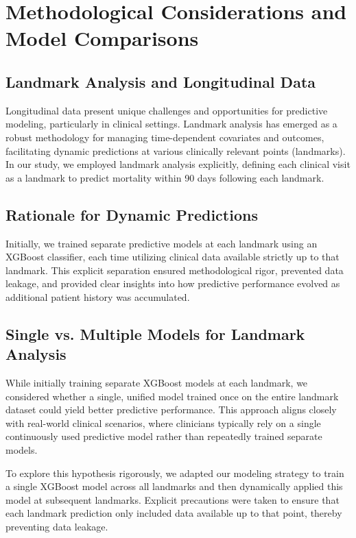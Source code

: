 \section{Methodological Considerations and Model Comparisons}

\subsection{Landmark Analysis and Longitudinal Data}
Longitudinal data present unique challenges and opportunities for predictive modeling, particularly in clinical settings. 
Landmark analysis has emerged as a robust methodology for managing time-dependent covariates and outcomes, facilitating dynamic 
predictions at various clinically relevant points (landmarks). In our study, we employed landmark analysis explicitly, 
defining each clinical visit as a landmark to predict mortality within 90 days following each landmark.

\subsection{Rationale for Dynamic Predictions}
Initially, we trained separate predictive models at each landmark using an XGBoost classifier, each time utilizing clinical 
data available strictly up to that landmark. This explicit separation ensured methodological rigor, prevented data leakage, 
and provided clear insights into how predictive performance evolved as additional patient history was accumulated.

\subsection{Single vs. Multiple Models for Landmark Analysis}
While initially training separate XGBoost models at each landmark, we considered whether a single, unified model trained once
on the entire landmark dataset could yield better predictive performance. This approach aligns closely with real-world 
clinical scenarios, where clinicians typically rely on a single continuously used predictive model rather than repeatedly trained separate models.

To explore this hypothesis rigorously, we adapted our modeling strategy to train a single XGBoost model across all landmarks 
and then dynamically applied this model at subsequent landmarks. Explicit precautions were taken to ensure that each landmark prediction 
only included data available up to that point, thereby preventing data leakage.

